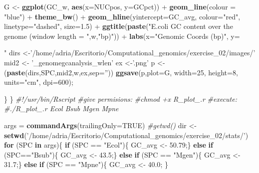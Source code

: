 \documentclass[10pt,a4paper,]{article}
\newenvironment{Shaded}{}{}
\newcommand{\CommentTok}[1]{\textcolor[rgb]{0.38,0.63,0.69}{\textit{#1}}}
\newcommand{\ControlFlowTok}[1]{\textcolor[rgb]{0.00,0.44,0.13}{\textbf{#1}}}
\newcommand{\DataTypeTok}[1]{\textcolor[rgb]{0.56,0.13,0.00}{#1}}
\newcommand{\DecValTok}[1]{\textcolor[rgb]{0.25,0.63,0.44}{#1}}
\newcommand{\FloatTok}[1]{\textcolor[rgb]{0.25,0.63,0.44}{#1}}
\newcommand{\KeywordTok}[1]{\textcolor[rgb]{0.00,0.44,0.13}{\textbf{#1}}}
\newcommand{\NormalTok}[1]{#1}
\newcommand{\OperatorTok}[1]{\textcolor[rgb]{0.40,0.40,0.40}{#1}}
\newcommand{\OtherTok}[1]{\textcolor[rgb]{0.00,0.44,0.13}{#1}}
\newcommand{\StringTok}[1]{\textcolor[rgb]{0.25,0.44,0.63}{#1}}
\begin{document}
\begin{Shaded}
\begin{Highlighting}[]
\NormalTok{    G <-}\StringTok{ }\KeywordTok{ggplot}\NormalTok{(GC_w, }\KeywordTok{aes}\NormalTok{(}\DataTypeTok{x=}\NormalTok{NUCpos, }\DataTypeTok{y=}\NormalTok{GCpct)) }\OperatorTok{+}
\StringTok{      }\KeywordTok{geom_line}\NormalTok{(}\DataTypeTok{colour =} \StringTok{"blue"}\NormalTok{) }\OperatorTok{+}
\StringTok{      }\KeywordTok{theme_bw}\NormalTok{() }\OperatorTok{+}
\StringTok{      }\KeywordTok{geom_hline}\NormalTok{(}\DataTypeTok{yintercept=}\NormalTok{GC_avg, }\DataTypeTok{colour=}\StringTok{"red"}\NormalTok{, }\DataTypeTok{linetype=}\StringTok{"dashed"}\NormalTok{, }\DataTypeTok{size=}\FloatTok{1.5}\NormalTok{) }\OperatorTok{+}
\StringTok{      }\KeywordTok{ggtitle}\NormalTok{(}\KeywordTok{paste}\NormalTok{(}\StringTok{"E.coli GC content over the genome (window length = "}\NormalTok{,w,}\StringTok{"bp)"}\NormalTok{)) }\OperatorTok{+}
\StringTok{      }\KeywordTok{labs}\NormalTok{(}\DataTypeTok{x=}\StringTok{"Genomic Coords (bp)"}\NormalTok{, }\DataTypeTok{y=}\StringTok{"%GC Content"}\NormalTok{);}
\NormalTok{    dirs <-}\StringTok{'/home/adria/Escritorio/Computational_genomics/exercise_02/images/'}
\NormalTok{    mid2 <-}\StringTok{ '_genomegcanalysis_wlen'}
\NormalTok{    ex <-}\StringTok{'.png'}
\NormalTok{    p <-}\StringTok{ }\NormalTok{(}\KeywordTok{paste}\NormalTok{(dirs,SPC,mid2,w,ex,}\DataTypeTok{sep=}\StringTok{''}\NormalTok{))}
    \KeywordTok{ggsave}\NormalTok{(p,}\DataTypeTok{plot=}\NormalTok{G, }\DataTypeTok{width=}\DecValTok{25}\NormalTok{, }\DataTypeTok{height=}\DecValTok{8}\NormalTok{, }\DataTypeTok{units=}\StringTok{"cm"}\NormalTok{, }\DataTypeTok{dpi=}\DecValTok{600}\NormalTok{);}

\NormalTok{  \}}
\NormalTok{\}}
\CommentTok{#!/usr/bin/Rscript}
\CommentTok{#give permisions:}
\CommentTok{#chmod +x R_plot_.r}
\CommentTok{#execute:}
\CommentTok{#./R_plot_.r Ecol Bsub Mgen Mpne}

\NormalTok{args =}\StringTok{ }\KeywordTok{commandArgs}\NormalTok{(}\DataTypeTok{trailingOnly=}\OtherTok{TRUE}\NormalTok{)}
\CommentTok{#getwd()}
\NormalTok{dir <-}\StringTok{ }\KeywordTok{setwd}\NormalTok{(}\StringTok{'/home/adria/Escritorio/Computational_genomics/exercise_02/stats/'}\NormalTok{)}
\ControlFlowTok{for}\NormalTok{ (SPC }\ControlFlowTok{in}\NormalTok{ args)\{}
  \ControlFlowTok{if}\NormalTok{ (SPC }\OperatorTok{==}\StringTok{ "Ecol"}\NormalTok{)\{}
\NormalTok{    GC_avg <-}\StringTok{ }\FloatTok{50.79}\NormalTok{;\}}
  \ControlFlowTok{else} \ControlFlowTok{if}\NormalTok{ (SPC}\OperatorTok{==}\StringTok{"Bsub"}\NormalTok{)\{}
\NormalTok{    GC_avg <-}\StringTok{ }\FloatTok{43.5}\NormalTok{;\}}
  \ControlFlowTok{else} \ControlFlowTok{if}\NormalTok{ (SPC }\OperatorTok{==}\StringTok{ "Mgen"}\NormalTok{)\{}
\NormalTok{    GC_avg <-}\StringTok{ }\FloatTok{31.7}\NormalTok{;\}}
  \ControlFlowTok{else} \ControlFlowTok{if}\NormalTok{ (SPC }\OperatorTok{==}\StringTok{ "Mpne"}\NormalTok{)\{}
\NormalTok{    GC_avg <-}\StringTok{ }\FloatTok{40.0}\NormalTok{;}
\NormalTok{  \}}

}
\end{Highlighting}
\end{Shaded}
\end{document}
